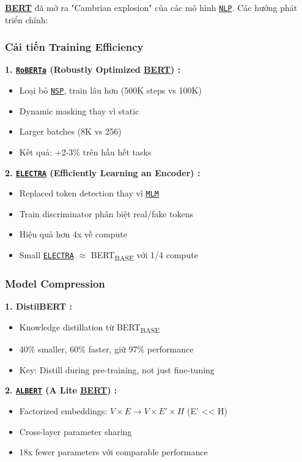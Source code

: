 \hyperref[acro:bert]{\textbf{BERT}} đã mở ra "Cambrian explosion" của các mô hình \hyperref[acro:nlp]{\texttt{NLP}}. Các hướng phát triển chính:

\subsubsection{Cải tiến Training Efficiency}

\textbf{1. \hyperref[acro:roberta]{\texttt{RoBERTa}} (Robustly Optimized \hyperref[acro:bert]{\textbf{BERT}}) \cite{liu2019roberta}:}
\begin{itemize}
    \item Loại bỏ \hyperref[acro:nsp]{\texttt{NSP}}, train lâu hơn (500K steps vs 100K)
    \item Dynamic masking thay vì static
    \item Larger batches (8K vs 256)
    \item Kết quả: +2-3\% trên hầu hết tasks
\end{itemize}

\textbf{2. \hyperref[acro:electra]{\texttt{ELECTRA}} (Efficiently Learning an Encoder) \cite{clark2020electra}:}
\begin{itemize}
    \item Replaced token detection thay vì \hyperref[acro:mlm]{\texttt{MLM}}
    \item Train discriminator phân biệt real/fake tokens
    \item Hiệu quả hơn 4x về compute
    \item Small \hyperref[acro:electra]{\texttt{ELECTRA}} $\approx$ BERT\textsubscript{BASE} với 1/4 compute
\end{itemize}

\subsubsection{Model Compression}

\textbf{1. DistilBERT \cite{sanh2019distilbert}:}
\begin{itemize}
    \item Knowledge distillation từ BERT\textsubscript{BASE}
    \item 40\% smaller, 60\% faster, giữ 97\% performance
    \item Key: Distill during pre-training, not just fine-tuning
\end{itemize}

\textbf{2. \hyperref[acro:albert]{\texttt{ALBERT}} (A Lite \hyperref[acro:bert]{\textbf{BERT}}) \cite{lan2019albert}:}
\begin{itemize}
    \item Factorized embeddings: $V \times E \rightarrow V \times E' \times H$ (E' << H)
    \item Cross-layer parameter sharing
    \item 18x fewer parameters với comparable performance
\end{itemize}

